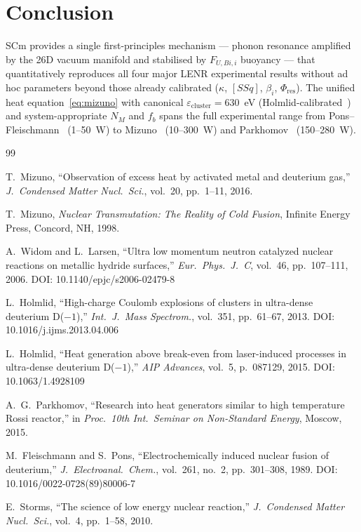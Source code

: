 \documentclass[11pt,a4paper]{article}
\begin{document}
\section{Conclusion}

SCm provides a single first-principles mechanism --- phonon resonance amplified by the
26D vacuum manifold and stabilised by $F_{U,Bi,i}$ buoyancy --- that quantitatively
reproduces all four major LENR experimental results without ad hoc parameters beyond
those already calibrated ($\kappa$, $[SSq]$, $\beta_i$, $\Phi_{\text{res}}$).
The unified heat equation~\eqref{eq:mizuno} with canonical
$\varepsilon_{\text{cluster}}=630$~eV (Holmlid-calibrated~\cite{holmlid2013,holmlid2015})
and system-appropriate $N_M$ and $f_b$ spans the full experimental range from
Pons--Fleischmann~\cite{fleischmann1989} (1--50~W) to
Mizuno~\cite{mizuno2016} (10--300~W) and
Parkhomov~\cite{parkhomov2015} (150--280~W).

\begin{thebibliography}{99}

T.~Mizuno,
``Observation of excess heat by activated metal and deuterium gas,''
\textit{J.\ Condensed Matter Nucl.\ Sci.}, vol.~20, pp.~1--11, 2016.

T.~Mizuno,
\textit{Nuclear Transmutation: The Reality of Cold Fusion},
Infinite Energy Press, Concord, NH, 1998.

A.~Widom and L.~Larsen,
``Ultra low momentum neutron catalyzed nuclear reactions on metallic hydride
surfaces,''
\textit{Eur.\ Phys.\ J.\ C}, vol.~46, pp.~107--111, 2006.
\newblock DOI: 10.1140/epjc/s2006-02479-8

L.~Holmlid,
``High-charge Coulomb explosions of clusters in ultra-dense deuterium D($-1$),''
\textit{Int.\ J.\ Mass Spectrom.}, vol.~351, pp.~61--67, 2013.
\newblock DOI: 10.1016/j.ijms.2013.04.006

L.~Holmlid,
``Heat generation above break-even from laser-induced processes in ultra-dense
deuterium D($-1$),''
\textit{AIP Advances}, vol.~5, p.~087129, 2015.
\newblock DOI: 10.1063/1.4928109

A.~G.~Parkhomov,
``Research into heat generators similar to high temperature Rossi reactor,''
in \textit{Proc.\ 10th Int.\ Seminar on Non-Standard Energy}, Moscow, 2015.

M.~Fleischmann and S.~Pons,
``Electrochemically induced nuclear fusion of deuterium,''
\textit{J.\ Electroanal.\ Chem.}, vol.~261, no.~2, pp.~301--308, 1989.
\newblock DOI: 10.1016/0022-0728(89)80006-7

E.~Storms,
``The science of low energy nuclear reaction,''
\textit{J.\ Condensed Matter Nucl.\ Sci.}, vol.~4, pp.~1--58, 2010.

\end{thebibliography}
\end{document}
